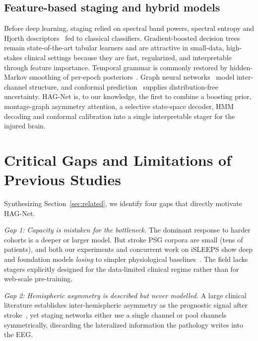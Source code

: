 \documentclass[journal]{IEEEtran}
\begin{document}
\subsection{Feature-based staging and hybrid models}
Before deep learning, staging relied on spectral band powers, spectral entropy and
Hjorth descriptors~\cite{hjorth1970eeg} fed to classical classifiers.
Gradient-boosted decision trees~\cite{chen2016xgboost,ke2017lightgbm,
prokhorenkova2018catboost} remain state-of-the-art tabular learners and are
attractive in small-data, high-stakes clinical settings because they are fast,
regularized, and interpretable through feature importance. Temporal grammar is
commonly restored by hidden-Markov smoothing of per-epoch
posteriors~\cite{chen2024hmm}. Graph neural networks~\cite{velickovic2018gat} model
inter-channel structure, and conformal prediction~\cite{angelopoulos2023conformal}
supplies distribution-free uncertainty. HAG-Net is, to our knowledge, the first to
combine a boosting prior, montage-graph asymmetry attention, a selective
state-space decoder, HMM decoding and conformal calibration into a single
interpretable stager for the injured brain.

\section{Critical Gaps and Limitations of Previous Studies}
\label{sec:gaps}
Synthesizing Section~\ref{sec:related}, we identify four gaps that directly
motivate HAG-Net.

\emph{Gap 1: Capacity is mistaken for the bottleneck.} The dominant response to
harder cohorts is a deeper or larger model. But stroke PSG corpora are small (tens
of patients), and both our experiments and concurrent work on iSLEEPS show deep
and foundation models \emph{losing} to simpler physiological
baselines~\cite{bose2026gap,estevan2025ssl,sleepyland2026}. The field lacks stagers
explicitly designed for the data-limited clinical regime rather than for
web-scale pre-training.

\emph{Gap 2: Hemispheric asymmetry is described but never modelled.} A large
clinical literature establishes inter-hemispheric asymmetry as the prognostic
signal after stroke~\cite{gottselig2002stroke,anastasi2017bsi,simpson2023laterality},
yet staging networks either use a single channel or pool channels symmetrically,
discarding the lateralized information the pathology writes into the EEG.
\end{document}
